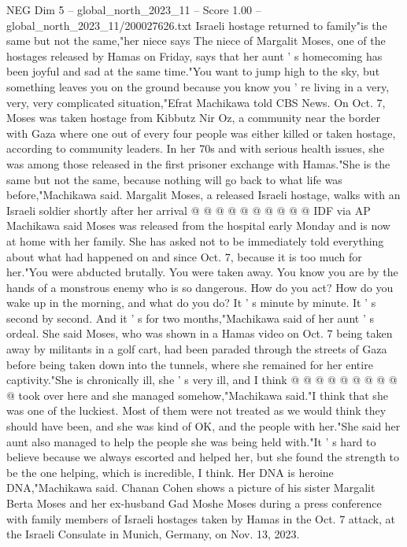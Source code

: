 \begin{textsample}{NEG Dim 5 – global\_north\_2023\_11 – Score 1.00 – global\_north\_2023\_11/200027626.txt}  \label{ex:f5_neg_037}
Israeli hostage returned to family"is the same but not the same,"her niece says The niece of Margalit Moses, one of the hostages released by Hamas on Friday, says that her aunt ' s homecoming has been joyful and sad at the same time."You want to jump high to the sky, but something leaves you on the ground because you know you ' re living in a very, very, very complicated situation,"Efrat Machikawa told CBS News.
On Oct. 7, Moses was taken hostage from Kibbutz Nir Oz, a community near the border with Gaza where one out of every four people was either killed or taken hostage, according to community leaders.
In her 70s and with serious health issues, she was among those released in the first prisoner exchange with Hamas."She is the same but not the same, because nothing will go back to what life was before,"Machikawa said.
Margalit Moses, a released Israeli hostage, walks with an Israeli soldier shortly after her arrival @ @ @ @ @ @ @ @ @ @ IDF via AP Machikawa said Moses was released from the hospital early Monday and is now at home with her family.
She has asked not to be immediately told everything about what had happened on and since Oct. 7, because it is too much for her."You were abducted brutally.
You were taken away.
You know you are by the hands of a monstrous enemy who is so dangerous.
How do you act?
How do you wake up in the morning, and what do you do?
It ' s minute by minute.
It ' s second by second.
And it ' s for two months,"Machikawa said of her aunt ' s ordeal.
She said Moses, who was shown in a Hamas video on Oct. 7 being taken away by militants in a golf cart, had been paraded through the streets of Gaza before being taken down into the tunnels, where she remained for her entire captivity."She is chronically ill, she ' s very ill, and I think @ @ @ @ @ @ @ @ @ @ took over here and she managed somehow,"Machikawa said."I think that she was one of the luckiest.
Most of them were not treated as we would think they should have been, and she was kind of OK, and the people with her."She said her aunt also managed to help the people she was being held with."It ' s hard to believe because we always escorted and helped her, but she found the strength to be the one helping, which is incredible, I think.
Her DNA is heroine DNA,"Machikawa said.
Chanan Cohen shows a picture of his sister Margalit Berta Moses and her ex-husband Gad Moshe Moses during a press conference with family members of Israeli hostages taken by Hamas in the Oct. 7 attack, at the Israeli Consulate in Munich, Germany, on Nov. 13, 2023.

\end{textsample}
